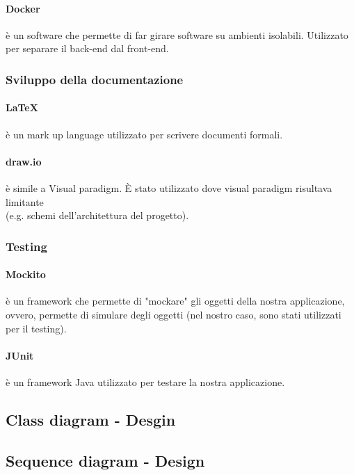 \paragraph{Docker} è un software che permette di far girare software su ambienti isolabili. Utilizzato per separare il back-end dal front-end.
\subsubsection{Sviluppo della documentazione}
\paragraph{\LaTeX} è un mark up language utilizzato per scrivere documenti formali.
\paragraph{draw.io} è simile a Visual paradigm. \`{E} stato utilizzato dove visual paradigm risultava limitante \\
(e.g. schemi dell'architettura del progetto).
\subsubsection{Testing}
\paragraph{Mockito} è un framework che permette di "mockare" gli oggetti della nostra applicazione, ovvero, permette di simulare degli oggetti (nel nostro caso, sono stati utilizzati per il testing).
\paragraph{JUnit} è un framework Java utilizzato per testare la nostra applicazione.
 \newpage
\subsection{Class diagram - Desgin}
\newpage
\subsection{Sequence diagram - Design}